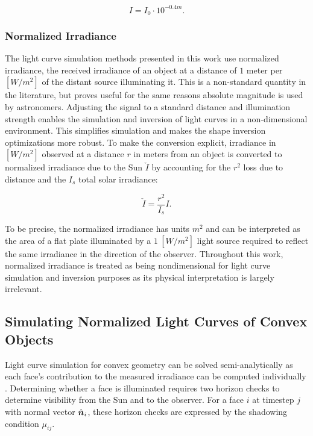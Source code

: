 \begin{equation} \label{eq:mag_to_irradiance}
  I = I_0 \cdot 10^{-0.4 m}.
\end{equation}

\subsubsection{Normalized Irradiance}

The light curve simulation methods presented in this work use normalized irradiance, the received irradiance of an object at a distance of $1$ meter per $\left[ W/m^2 \right]$ of the distant source illuminating it. This is a non-standard quantity in the literature, but proves useful for the same reasons absolute magnitude is used by astronomers. Adjusting the signal to a standard distance and illumination strength enables the simulation and inversion of light curves in a non-dimensional environment. This simplifies simulation and makes the shape inversion optimizations more robust. To make the conversion explicit, irradiance in $\left[ W/m^2 \right]$ observed at a distance $r$ in meters from an object is converted to normalized irradiance due to the Sun $\check{I}$ by accounting for the $r^2$ loss due to distance and the $I_s$ total solar irradiance:

\begin{equation} \label{eq:irradiance_to_norm_irradiance}
  \check{I} = \frac{r^2}{I_s} I.
\end{equation}

To be precise, the normalized irradiance has units $m^2$ and can be interpreted as the area of a flat plate illuminated by a $1 \: \left[W/m^2\right]$ light source required to reflect the same irradiance in the direction of the observer. Throughout this work, normalized irradiance is treated as being nondimensional for light curve simulation and inversion purposes as its physical interpretation is largely irrelevant.

\subsection{Simulating Normalized Light Curves of Convex Objects}

Light curve simulation for convex geometry can be solved semi-analytically as each face's contribution 
to the measured irradiance can be computed individually \cite{kaasalainen2001}. 
Determining whether a face is illuminated requires two horizon checks to determine visibility 
from the Sun and to the observer. For a face $i$ at timestep $j$ with normal vector $\hat{\bm{n}}_i$, these horizon checks are expressed by the shadowing condition $\mu_{ij}$. 

